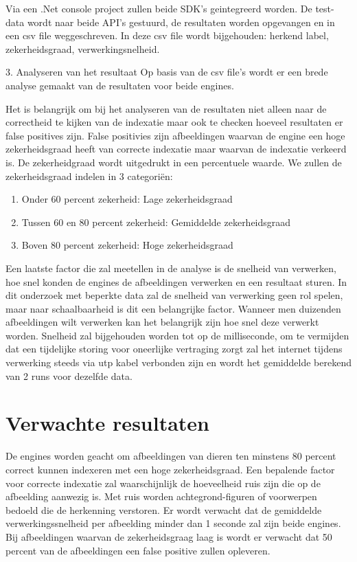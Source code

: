 Via een .Net console project zullen beide SDK's geintegreerd worden. De test-data wordt naar beide API's gestuurd, de resultaten worden opgevangen en in een csv file weggeschreven. In deze csv file wordt bijgehouden: herkend label, zekerheidsgraad, verwerkingsnelheid.

3. Analyseren van het resultaat
\linebreak
Op basis van de csv file's wordt er een brede analyse gemaakt van de resultaten voor beide engines.

Het is belangrijk om bij het analyseren van de resultaten niet alleen naar de correctheid te kijken van de indexatie maar ook te checken hoeveel resultaten er false positives zijn. False positivies zijn afbeeldingen waarvan de engine een hoge zekerheidsgraad heeft van correcte indexatie maar waarvan de indexatie verkeerd is. De zekerheidgraad wordt uitgedrukt in een percentuele waarde. We zullen de zekerheidsgraad indelen in 3 categoriën:

\begin{enumerate}
    \item Onder 60 percent zekerheid: Lage zekerheidsgraad
    \item Tussen 60 en 80 percent zekerheid: Gemiddelde zekerheidsgraad
    \item Boven 80 percent zekerheid: Hoge zekerheidsgraad
\end{enumerate}

Een laatste factor die zal meetellen in de analyse is de snelheid van verwerken, hoe snel konden de engines de afbeeldingen verwerken en een resultaat sturen. In dit onderzoek met beperkte data zal de snelheid van verwerking geen rol spelen, maar naar schaalbaarheid is dit een belangrijke factor. Wanneer men duizenden afbeeldingen wilt verwerken kan het belangrijk zijn hoe snel deze verwerkt worden.
Snelheid zal bijgehouden worden tot op de milliseconde, om te vermijden dat een tijdelijke storing voor oneerlijke vertraging zorgt zal het internet tijdens verwerking steeds via utp kabel verbonden zijn en wordt het gemiddelde berekend van 2 runs voor dezelfde data.

\section{Verwachte resultaten}
\label{sec:verwachte_resultaten}
De engines worden geacht om afbeeldingen van dieren ten minstens 80 percent correct kunnen indexeren met een hoge zekerheidsgraad. Een bepalende factor voor correcte indexatie zal waarschijnlijk de hoeveelheid ruis zijn die op de afbeelding aanwezig is. Met ruis worden achtegrond-figuren of voorwerpen bedoeld die de herkenning verstoren.
Er wordt verwacht dat de gemiddelde verwerkingssnelheid per afbeelding minder dan 1 seconde zal zijn beide engines.
Bij afbeeldingen waarvan de zekerheidsgraag laag is wordt er verwacht dat 50 percent van de afbeeldingen een false positive zullen opleveren.


